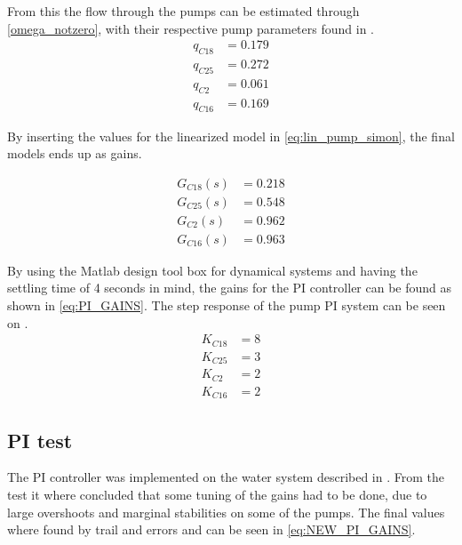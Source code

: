 From this the flow through the pumps can be estimated through \eqref{omega_notzero}, with their respective pump parameters found in .
\begin{equation}
\begin{split}
q_{C18} &= 0.179 \\
q_{C25} &= 0.272 \\
q_{C2} &= 0.061 \\
q_{C16} &= 0.169
\end{split}
\end{equation}

By inserting the values for the linearized model in \eqref{eq:lin_pump_simon}, the final models ends up as gains. 

\begin{equation}
	\begin{split}
	G_{C18}(s) &= 0.218 \\
	G_{C25}(s) &= 0.548 \\
	G_{C2}(s) &= 0.962 \\
	G_{C16}(s) &= 0.963
	\end{split}
\end{equation}


By using the Matlab design tool box for dynamical systems and having the settling time of 4 seconds in mind, the gains for the PI controller can be found as shown in \eqref{eq:PI_GAINS}. The step response of the pump PI system can be seen on .
\begin{equation}
	\begin{split}
	K_{C18} &= 8 \\
	K_{C25} &= 3 \\
	K_{C2} &= 2 \\
	K_{C16} &= 2
	\end{split}
	\label{eq:NEW_PI_GAINS}
\end{equation}

% 

\subsection*{PI test}

The PI controller was implemented on the water system described in . From the test it where concluded that some tuning of the gains had to be done, due to large overshoots and marginal stabilities on some of the pumps. The final values where found by trail and errors and can be seen in \eqref{eq:NEW_PI_GAINS}. 

